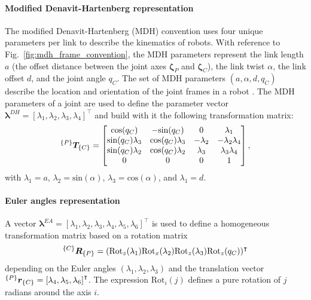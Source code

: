 \paragraph*{Modified Denavit-Hartenberg representation} The modified Denavit-Hartenberg (MDH) convention uses four unique parameters per link to describe the kinematics of robots. With reference to Fig.~\ref{fig:mdh_frame_convention}, the MDH parameters represent the
link length $a$ (the offset distance between the joint axes $\bm{\zeta}_P$ and $\bm{\zeta}_C$), the link twist $\alpha$, the link offset $d$, and the joint angle $q_C$. The set of MDH parameters $\left(a,\alpha,d,q_C\right)$ describe the location and orientation of the joint frames in a robot \cite{Craig1989Introductionroboticsmechanics}. The MDH parameters of a joint are used to define the parameter vector  $\bm{\lambda}^{DH} = \left[\lambda_1,\lambda_2,\lambda_3,\lambda_4\right]^\intercal$ and build with it the following transformation matrix:
\begin{equation}
 ^{\left\lbrace P \right\rbrace}\bm{T}_{\left\lbrace C \right\rbrace} =
 \begin{bmatrix}
   	\text{cos}(q_C)         &     -\text{sin}(q_C)    &      0    &      \lambda_1\\      
   	\text{sin}(q_C)\lambda_3& \text{cos}(q_C)\lambda_3& -\lambda_2& -\lambda_2\lambda_4\\
   	\text{sin}(q_C)\lambda_2& \text{cos}(q_C)\lambda_2&  \lambda_3&  \lambda_3\lambda_4\\
   	0                       &         0               &      0    &           1          
 \end{bmatrix},
\end{equation} 
with $\lambda_1 = a$, $\lambda_2 = \text{sin}(\alpha)$, $\lambda_3 = \text{cos}(\alpha)$, and $\lambda_1 = d$. 

\paragraph*{Euler angles representation} A vector $\bm{\lambda}^{EA} = \left[\lambda_1,\lambda_2,\lambda_3,\lambda_4,\lambda_5,\lambda_6\right]^\intercal$ is used to define a homogeneous transformation matrix based on a rotation matrix 
\begin{equation}
	      ^{\left\lbrace C \right\rbrace}\bm{R}_{\left\lbrace P \right\rbrace} = (\text{Rot}_z(\lambda_1)\text{Rot}_x(\lambda_2)\text{Rot}_z(\lambda_3)\text{Rot}_z(q_C))^\intercal
\end{equation}
depending on the Euler angles \cite{Siciliano2008RoboticsModellingPlanning} $\left(\lambda_1,\lambda_2,\lambda_3\right)$ and the translation vector $ ^{\left\lbrace P \right\rbrace}\bm{r}_{\left\lbrace C \right\rbrace} = \left[\lambda_4,\lambda_5,\lambda_6\right]^\intercal $. The expression $\text{Rot}_i(j)$ defines a pure rotation of $j$ radians around the axis $i$. 

